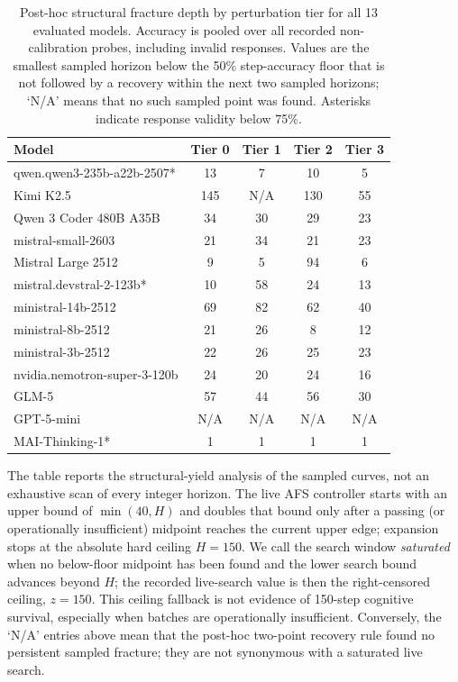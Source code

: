 \documentclass{article}
\begin{document}
\begin{table}[H]
\centering
\caption{Post-hoc structural fracture depth by perturbation tier for all 13 evaluated models. Accuracy is pooled over all recorded non-calibration probes, including invalid responses. Values are the smallest sampled horizon below the 50\% step-accuracy floor that is not followed by a recovery within the next two sampled horizons; `N/A' means that no such sampled point was found. Asterisks indicate response validity below 75\%.}
\label{tab:fracture_full}
\scriptsize
\begin{tabular}{lcccc}
\toprule
\textbf{Model} & \textbf{Tier 0} & \textbf{Tier 1} & \textbf{Tier 2} & \textbf{Tier 3} \\
\midrule
qwen.qwen3-235b-a22b-2507* & 13 & 7 & 10 & 5 \\
Kimi K2.5 & 145 & N/A & 130 & 55 \\
Qwen 3 Coder 480B A35B & 34 & 30 & 29 & 23 \\
mistral-small-2603 & 21 & 34 & 21 & 23 \\
Mistral Large 2512 & 9 & 5 & 94 & 6 \\
mistral.devstral-2-123b* & 10 & 58 & 24 & 13 \\
ministral-14b-2512 & 69 & 82 & 62 & 40 \\
ministral-8b-2512 & 21 & 26 & 8 & 12 \\
ministral-3b-2512 & 22 & 26 & 25 & 23 \\
nvidia.nemotron-super-3-120b & 24 & 20 & 24 & 16 \\
GLM-5 & 57 & 44 & 56 & 30 \\
GPT-5-mini & N/A & N/A & N/A & N/A \\
MAI-Thinking-1* & 1 & 1 & 1 & 1 \\
\bottomrule
\end{tabular}
\end{table}

The table reports the structural-yield analysis of the sampled curves, not an exhaustive scan of every integer horizon. The live AFS controller starts with an upper bound of $\min(40,H)$ and doubles that bound only after a passing (or operationally insufficient) midpoint reaches the current upper edge; expansion stops at the absolute hard ceiling $H=150$. We call the search window \emph{saturated} when no below-floor midpoint has been found and the lower search bound advances beyond $H$; the recorded live-search value is then the right-censored ceiling, $z=150$. This ceiling fallback is not evidence of 150-step cognitive survival, especially when batches are operationally insufficient. Conversely, the `N/A' entries above mean that the post-hoc two-point recovery rule found no persistent sampled fracture; they are not synonymous with a saturated live search.
\end{document}
